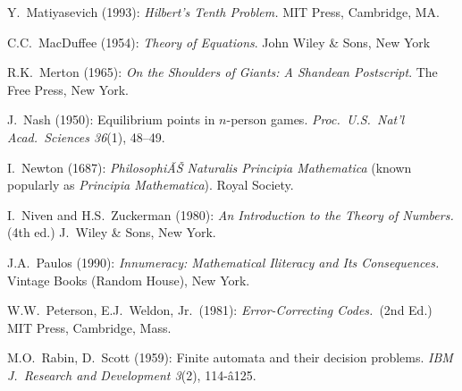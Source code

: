 \begin{thebibliography}{999}
Y.~Matiyasevich (1993):
{\it Hilbert's Tenth Problem.}
MIT Press, Cambridge, MA.

C.C.~MacDuffee (1954):
{\it Theory of Equations}.
John Wiley \& Sons, New York


R.K.~Merton (1965):
{\it On the Shoulders of Giants: A Shandean Postscript}.
The Free Press, New York.




J.~Nash (1950): Equilibrium points in $n$-person games.
{\it Proc.~U.S.~Nat'l Acad.~Sciences 36}(1), 48--49.

I.~Newton (1687): {\it PhilosophiÃŠ Naturalis Principia Mathematica}
(known popularly as {\it Principia Mathematica}).
Royal Society.


I.~Niven and H.S.~Zuckerman (1980):
{\it An Introduction to the Theory of Numbers.} (4th ed.)
J.~Wiley \& Sons, New York.




J.A.~Paulos (1990):
{\it Innumeracy: Mathematical Iliteracy and Its Consequences.}
Vintage Books (Random House), New York.

W.W.~Peterson, E.J.~Weldon, Jr.~(1981):
{\it Error-Correcting Codes.}~(2nd Ed.)
MIT Press, Cambridge, Mass.



M.O.~Rabin, D.~Scott (1959): Finite automata and their decision
problems.  {\it IBM J.~Research and Development 3}(2), 114-â125.




\end{thebibliography}
